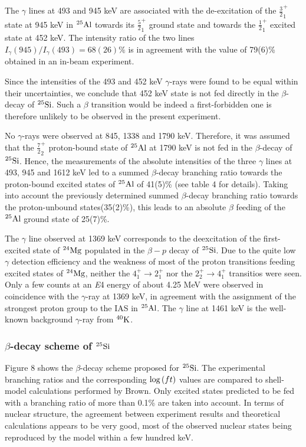 \documentclass[UTF8]{ctexart}
\begin{document}
The $\gamma$ lines at 493 and 945 keV are associated with the de-excitation of the $\frac{3}{2}_{1}^{+}$ state at 945 keV in $^{25}\textnormal{Al}$ towards its $\frac{5}{2}_{1}^{+}$ ground state and towards the $\frac{1}{2}_{1}^{+}$ excited state at 452 keV. The intensity ratio of the two lines $I_{\gamma}(945)/I_{\gamma }(493)=68(26)\%$ is in agreement with the value of 79(6)\% obtained in an in-beam experiment.

Since the intensities of the 493 and 452 keV $\gamma$-rays were found to be equal within their uncertainties, we conclude that 452 keV state is not fed directly in the $\beta$-decay of $^{25}\textnormal{Si}$. Such a $\beta$ transition would be indeed a first-forbidden one is therefore unlikely to be observed in the present experiment.

No $\gamma$-rays were observed at 845, 1338 and 1790 keV. Therefore, it was assumed that the $\frac{7}{2}_{2}^{+}$ proton-bound state of $^{25}\textnormal{Al}$ at 1790 keV is not fed in the $\beta$-decay of $^{25}\textnormal{Si}$. Hence, the measurements of the absolute intensities of the three $\gamma$ lines at 493, 945 and 1612 keV led to a summed $\beta$-decay branching ratio towards the proton-bound excited states of $^{25}\textnormal{Al}$ of 41(5)\% (see table 4 for details). Taking into account the previously determined summed $\beta$-decay branching ratio towards the proton-unbound states(35(2)\%), this leads to an absolute $\beta$ feeding of the $^{25}\textnormal{Al}$ ground state of 25(7)\%.

The $\gamma$ line observed at 1369 keV corresponds to the deexcitation of the first-excited state of $^{24}\textnormal{Mg}$ populated in the $\beta-p$ decay of $^{25}\textnormal{Si}$. Due to the quite low $\gamma$ detection efficiency and the weakness of most of the proton transitions feeding excited states of $^{24}\textnormal{Mg}$, neither the $4_{1}^{+}\to 2_{1}^{+}$ nor the $2_{2}^{+}\to 4_{1}^{+}$ transitios were seen. Only a few counts at an \textit{E}4 energy of about 4.25 MeV were observed in coincidence with the $\gamma$-ray at 1369 keV, in agreement with the assignment of the strongest proton group to the IAS in $^{25}\textnormal{Al}$. The $\gamma$ line at 1461 keV is the well-known background $\gamma$-ray from $^{40}\textnormal{K}$.

\subsubsection{$\beta$-decay scheme of $^{25}\textnormal{Si}$}
Figure 8 shows the $\beta$-decay scheme proposed for $^{25}\textnormal{Si}$. The experimental branching ratios and the corresponding $\textnormal{log}\left( ft \right)$ values are compared to shell-model calculations performed by Brown. Only excited states predicted to be fed with a branching ratio of more than 0.1\% are taken into account. In terms of nuclear structure, the agreement between experiment results and theoretical calculations appears to be very good, most of the observed nuclear states being reproduced by the model within a few hundred keV.
\end{document}
